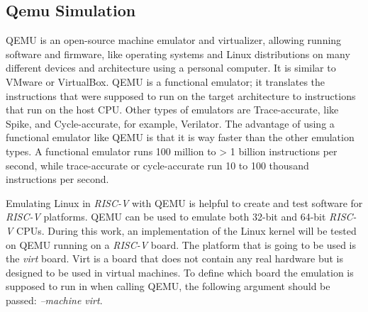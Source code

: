 \subsection{Qemu Simulation}
QEMU is an open-source machine emulator and virtualizer, allowing running software and firmware, like operating systems and Linux distributions on many different devices and architecture using a personal computer. It is similar to VMware or VirtualBox. QEMU is a functional emulator; it translates the instructions that were supposed to run on the target architecture to instructions that run on the host CPU. Other types of emulators are Trace-accurate, like Spike, and Cycle-accurate, for example, Verilator. The advantage of using a functional emulator like QEMU is that it is way faster than the other emulation types. A functional emulator runs 100 million to > 1 billion instructions per second, while trace-accurate or cycle-accurate run 10 to 100 thousand instructions per second.

Emulating Linux in \textit{RISC-V} with QEMU is helpful to create and test software for \textit{RISC-V} platforms. QEMU can be used to emulate both 32-bit and 64-bit \textit{RISC-V} CPUs. During this work, an implementation of the Linux kernel will be tested on QEMU running on a \textit{RISC-V} board. The platform that is going to be used is the \textit{virt} board. Virt is a board that does not contain any real hardware but is designed to be used in virtual machines. To define which board the emulation is supposed to run in when calling QEMU, the following argument should be passed: \textit{--machine virt}.
